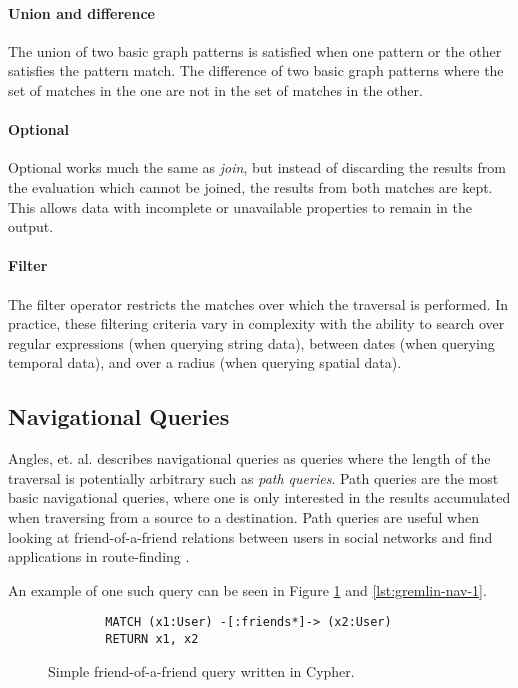 \paragraph{Union and difference} The union of two basic graph patterns is satisfied when one pattern or the other satisfies the pattern match. The difference of two basic graph patterns where the set of matches in the one are not in the set of matches in the other.

\paragraph{Optional} Optional works much the same as \emph{join}, but instead of discarding the results from the evaluation which cannot be joined, the results from both matches are kept. This allows data with incomplete or unavailable properties to remain in the output.

\paragraph{Filter} The filter operator restricts the matches over which the traversal is performed. In practice, these filtering criteria vary in complexity with the ability to search over regular expressions (when querying string data), between dates (when querying temporal data), and over a radius (when querying spatial data).

\subsection{Navigational Queries}

Angles, et. al. \cite{foundations-of-modern-gql} describes navigational queries as queries where the length of the traversal is potentially arbitrary such as \emph{path queries}. Path queries are the most basic navigational queries, where one is only interested in the results accumulated when traversing from a source to a destination. Path queries are useful when looking at friend-of-a-friend relations between users in social networks and find applications in route-finding \cite{route-finding}.

An example of one such query can be seen in Figure \ref{lst:cypher-nav-1} and \ref{lst:gremlin-nav-1}.

\begin{figure}
    \centering
    \begin{verbatim}
        MATCH (x1:User) -[:friends*]-> (x2:User)
        RETURN x1, x2
    \end{verbatim}
    \caption{Simple friend-of-a-friend query written in Cypher.}
    \label{lst:cypher-nav-1}
\end{figure}


